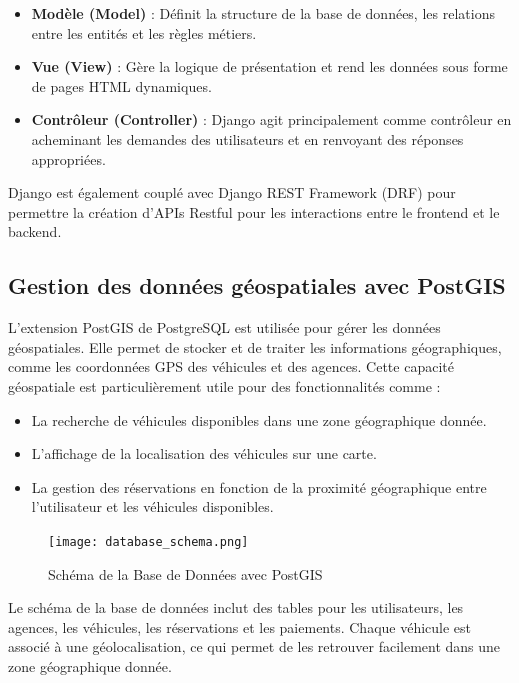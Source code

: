 \begin{itemize}
    \item \textbf{Modèle (Model)} : Définit la structure de la base de données, les relations entre les entités et les règles métiers.
    \item \textbf{Vue (View)} : Gère la logique de présentation et rend les données sous forme de pages HTML dynamiques.
    \item \textbf{Contrôleur (Controller)} : Django agit principalement comme contrôleur en acheminant les demandes des utilisateurs et en renvoyant des réponses appropriées.
\end{itemize}

Django est également couplé avec Django REST Framework (DRF) pour permettre la création d'APIs Restful pour les interactions entre le frontend et le backend.

\subsection{Gestion des données géospatiales avec PostGIS}
L'extension PostGIS de PostgreSQL est utilisée pour gérer les données géospatiales. Elle permet de stocker et de traiter les informations géographiques, comme les coordonnées GPS des véhicules et des agences. Cette capacité géospatiale est particulièrement utile pour des fonctionnalités comme :
\begin{itemize}
    \item La recherche de véhicules disponibles dans une zone géographique donnée.
    \item L'affichage de la localisation des véhicules sur une carte.
    \item La gestion des réservations en fonction de la proximité géographique entre l'utilisateur et les véhicules disponibles.
\end{itemize}

\begin{figure}[h!]
    \centering
    \texttt{[image: database\_schema.png]}
    \caption{Schéma de la Base de Données avec PostGIS}
    \label{fig:database_schema}
\end{figure}

Le schéma de la base de données inclut des tables pour les utilisateurs, les agences, les véhicules, les réservations et les paiements. Chaque véhicule est associé à une géolocalisation, ce qui permet de les retrouver facilement dans une zone géographique donnée.

